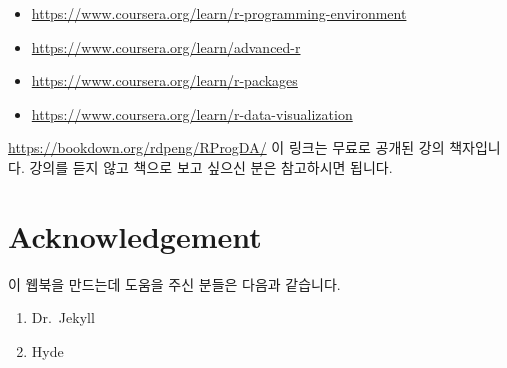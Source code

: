 \documentclass[11pt,]{krantz}
\providecommand{\tightlist}{%
  \setlength{\itemsep}{0pt}\setlength{\parskip}{0pt}}
\theoremstyle{definition}
\theoremstyle{definition}
\theoremstyle{remark}
\begin{document}
\begin{itemize}
\tightlist
\item
  \url{https://www.coursera.org/learn/r-programming-environment}
\item
  \url{https://www.coursera.org/learn/advanced-r}
\item
  \url{https://www.coursera.org/learn/r-packages}
\item
  \url{https://www.coursera.org/learn/r-data-visualization}
\end{itemize}

\url{https://bookdown.org/rdpeng/RProgDA/} 이 링크는 무료로 공개된 강의
책자입니다. 강의를 듣지 않고 책으로 보고 싶으신 분은 참고하시면 됩니다.

\chapter{Acknowledgement}\label{acknowledgement}

이 웹북을 만드는데 도움을 주신 분들은 다음과 같습니다.

\begin{enumerate}
\def\labelenumi{\arabic{enumi}.}
\tightlist
\item
  Dr.~Jekyll
\item
  Hyde
\end{enumerate}



\backmatter
\printindex
\end{document}
